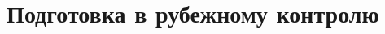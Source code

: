 \documentclass[a4paper]{article}
\begin{document}
  \title{Подготовка в рубежному контролю}
   
\end{document}
